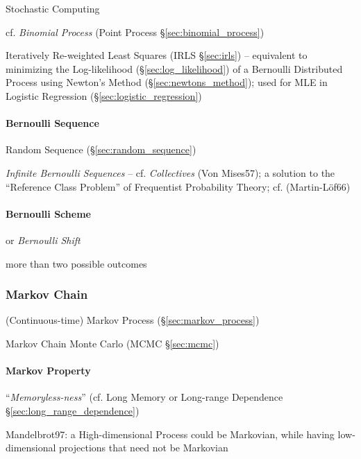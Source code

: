 Stochastic Computing

cf. \emph{Binomial Process} (Point Process \S\ref{sec:binomial_process})

Iteratively Re-weighted Least Squares (IRLS \S\ref{sec:irls}) -- equivalent to
minimizing the Log-likelihood (\S\ref{sec:log_likelihood}) of a Bernoulli
Distributed Process using Newton's Method (\S\ref{sec:newtons_method}); used for
MLE in Logistic Regression (\S\ref{sec:logistic_regression})



\paragraph{Bernoulli Sequence}\label{sec:bernoulli_sequence}\hfill

Random Sequence (\S\ref{sec:random_sequence})

\emph{Infinite Bernoulli Sequences} -- cf. \emph{Collectives} (Von Mises57); a
solution to the ``Reference Class Problem'' of Frequentist Probability Theory;
cf. (Martin-L\"of66)



\paragraph{Bernoulli Scheme}\label{sec:bernoulli_scheme}\hfill

or \emph{Bernoulli Shift}

more than two possible outcomes



\subsubsection{Markov Chain}\label{sec:markov_chain}

\fist (Continuous-time) Markov Process (\S\ref{sec:markov_process})

Markov Chain Monte Carlo (MCMC \S\ref{sec:mcmc})



\paragraph{Markov Property}\label{sec:markov_property}\hfill

``\emph{Memoryless-ness}'' (cf. Long Memory or Long-range Dependence
\S\ref{sec:long_range_dependence})

Mandelbrot97: a High-dimensional Process could be Markovian, while having
low-dimensional projections that need not be Markovian



